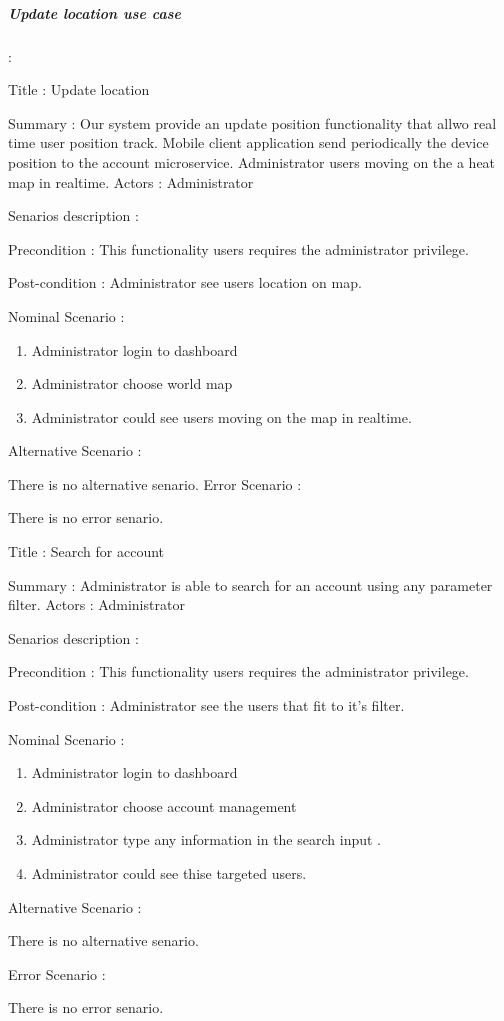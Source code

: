  \subparagraph{Update location use case} :
\label{sec:sec01}   
\begin{flushleft}

Title : Update location

Summary : Our system provide an update position functionality that allwo real time user position track. Mobile client application send periodically 
the device position to the account microservice. Administrator users moving on the a heat map in realtime.
Actors : Administrator

Senarios description :

Precondition : This functionality users requires the administrator privilege.

Post-condition : Administrator see users location on map.

Nominal Scenario :

 \begin{enumerate}
   \item Administrator login to dashboard
   \item Administrator choose world map 
   \item Administrator could see users moving on the map in realtime.  
 \end{enumerate}

Alternative Scenario :

There is no alternative senario.
Error Scenario :

There is no error senario.

Title : Search for account

Summary : Administrator is able to search for an account using any parameter filter.
Actors : Administrator

Senarios description :

Precondition : This functionality users requires the administrator privilege.

Post-condition : Administrator see the users that fit to it's filter.

Nominal Scenario :

 \begin{enumerate}
   \item Administrator login to dashboard
   \item Administrator choose account management
   \item Administrator type any information in the search input .  
   \item Administrator could see thise targeted users.
 \end{enumerate}

Alternative Scenario :

There is no alternative senario.

Error Scenario :

There is no error senario.
\end{flushleft}

